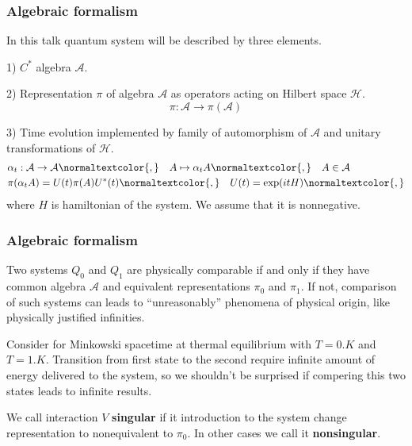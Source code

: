 \documentclass[10pt,t]{beamer}  %
\newcommand{\Ac}{\mathcal{A}}
\newcommand{\Hc}{\mathcal{H}}
\begin{document}
\begin{frame}
  \frametitle{Algebraic formalism}


  In this talk quantum system will be described by three elements.

  1) $C^{ * }$ algebra $\Ac$.

  2) Representation $\pi$ of algebra $\Ac$ as operators acting on
  Hilbert space $\Hc$.
  \begin{equation}
    \label{eq:1}
    \pi: \Ac \to \pi( \Ac )
  \end{equation}

  3) Time evolution implemented by family of automorphism of $\Ac$ and
  unitary transformations of $\Hc$.
  \begin{align*}
    &\alpha_{ t }: \Ac \to \Ac\normaltextcolor{,}
      \quad
      A \mapsto \alpha_{ t }A\normaltextcolor{,}
      \quad
      A \in \Ac \\
    &\pi( \alpha_{ t } A ) = U( t ) \pi( A ) U^{ * }( t )\normaltextcolor{,}
      \quad
      U( t ) = \exp( it H )\normaltextcolor{,}
  \end{align*}
  where $H$ is hamiltonian of the system. We assume that it is
  nonnegative.

\end{frame}





\begin{frame}
  \frametitle{Algebraic formalism}


  Two systems $Q_{ 0 }$ and $Q_{ 1 }$ are physically comparable if and
  only if they have common algebra $\Ac$ and equivalent
  representations $\pi_{ 0 }$ and $\pi_{ 1 }$. If not, comparison of
  such systems can leads to ``unreasonably'' phenomena of physical
  origin, like physically justified infinities.

  Consider for Minkowski spacetime at thermal equilibrium with
  $T = 0 \si{.K}$ and $T = 1 \si{.K}$. Transition from first state to
  the second require infinite amount of energy delivered to the
  system, so we shouldn't be surprised if compering this two states
  leads to infinite results.

  We call interaction $V$ \textbf{singular} if it introduction to the
  system change representation to nonequivalent to $\pi_{ 0 }$. In
  other cases we call it \textbf{nonsingular}.

\end{frame}
\end{document}
